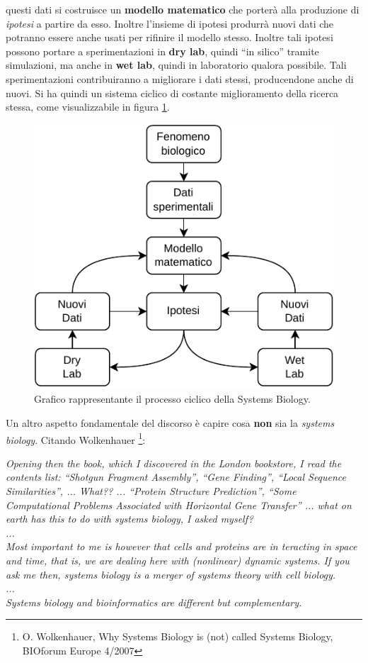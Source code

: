\documentclass[a4paper,12pt, oneside]{book}
\begin{document}
questi dati si costruisce un \textbf{modello matematico} che porterà alla
produzione 
di \textit{ipotesi} a partire da esso. Inoltre l'insieme di ipotesi produrrà
nuovi dati che potranno essere anche usati per rifinire il modello
stesso. Inoltre tali ipotesi possono portare a sperimentazioni in \textbf{dry
  lab}, quindi ``in silico'' tramite simulazioni, ma anche in \textbf{wet lab},
quindi in laboratorio qualora possibile. Tali sperimentazioni contribuiranno a
migliorare i dati stessi, producendone anche di nuovi. Si ha quindi un sistema
ciclico di costante miglioramento della ricerca stessa, come visualizzabile in
figura \ref{fig:csb}.\\
\begin{figure}
  \centering
  \includegraphics[scale = 0.8]{img/csb.pdf}
  \caption{Grafico rappresentante il processo ciclico della Systems Biology.} 
  \label{fig:csb}
\end{figure}
Un altro aspetto fondamentale del discorso è capire cosa \textbf{non} sia la
\textit{systems biology}. Citando Wolkenhauer \footnote{O. Wolkenhauer, Why
  Systems Biology is (not) called Systems Biology, BIOforum Europe 4/2007}:
\begin{center}
  \textit{Opening then the book, which I discovered in the London bookstore, I
    read the contents list: “Shotgun Fragment Assembly”, “Gene Finding”, “Local
    Sequence Similarities”, ... What?? ... “Protein Structure Prediction”, “Some 
    Computational Problems Associated with Horizontal Gene Transfer” ... what on
    earth has this to do with systems biology, I asked myself?}\\
  \textit{...}\\
  \textit{Most important to me is
    however that cells and proteins are in  teracting in space and time, that
    is, we are dealing here with (nonlinear) dynamic systems. If you ask me
    then, systems biology is a merger of systems theory with cell biology.}
  \\
  \textit{...}\\
  \textit{Systems biology and bioinformatics are different but complementary.}
\end{center}
\end{document}
